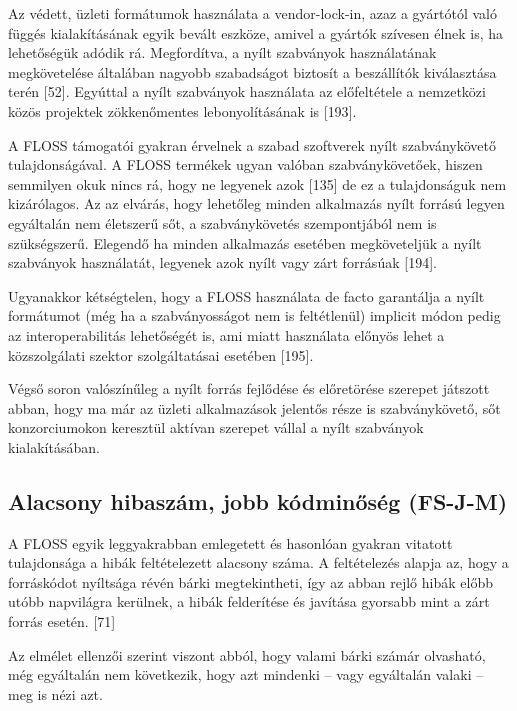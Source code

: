 \documentclass[12pt,magyar,a4paper,oneside]{scrreprt}
\begin{document}
Az védett, üzleti formátumok használata a vendor-lock-in, azaz a
gyártótól való függés kialakításának egyik bevált eszköze, amivel a
gyártók szívesen élnek is, ha lehetőségük adódik rá. Megfordítva, a
nyílt szabványok használatának megkövetelése általában nagyobb
szabadságot biztosít a beszállítók kiválasztása terén {[}52{]}. Egyúttal
a nyílt szabványok használata az előfeltétele a nemzetközi közös
projektek zökkenőmentes lebonyolításának is {[}193{]}.

A FLOSS támogatói gyakran érvelnek a szabad szoftverek nyílt
szabványkövető tulajdonságával. A FLOSS termékek ugyan valóban
szabványkövetőek, hiszen semmilyen okuk nincs rá, hogy ne legyenek azok
{[}135{]} de ez a tulajdonságuk nem kizárólagos. Az az elvárás, hogy
lehetőleg minden alkalmazás nyílt forrású legyen egyáltalán nem
életszerű sőt, a szabványkövetés szempontjából nem is szükségszerű.
Elegendő ha minden alkalmazás esetében megköveteljük a nyílt szabványok
használatát, legyenek azok nyílt vagy zárt forrásúak {[}194{]}.

Ugyanakkor kétségtelen, hogy a FLOSS használata de facto garantálja a
nyílt formátumot (még ha a szabványosságot nem is feltétlenül) implicit
módon pedig az interoperabilitás lehetőségét is, ami miatt használata
előnyös lehet a közszolgálati szektor szolgáltatásai esetében {[}195{]}.

Végső soron valószínűleg a nyílt forrás fejlődése és előretörése
szerepet játszott abban, hogy ma már az üzleti alkalmazások jelentős
része is szabványkövető, sőt konzorciumokon keresztül aktívan szerepet
vállal a nyílt szabványok kialakításában.

\hypertarget{sec:FS-J-M}{%
\subsection{Alacsony hibaszám, jobb kódminőség
(FS-J-M)}\label{sec:FS-J-M}}

A FLOSS egyik leggyakrabban emlegetett és hasonlóan gyakran vitatott
tulajdonsága a hibák feltételezett alacsony száma. A feltételezés alapja
az, hogy a forráskódot nyíltsága révén bárki megtekintheti, így az abban
rejlő hibák előbb utóbb napvilágra kerülnek, a hibák felderítése és
javítása gyorsabb mint a zárt forrás esetén. {[}71{]}

Az elmélet ellenzői szerint viszont abból, hogy valami bárki számár
olvasható, még egyáltalán nem következik, hogy azt mindenki -- vagy
egyáltalán valaki -- meg is nézi azt.
\end{document}
